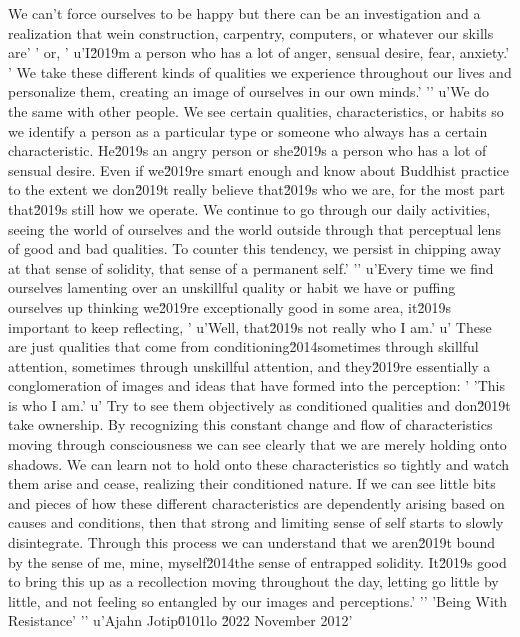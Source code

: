 We can't force ourselves to be happy but there can be an investigation 
and a realization that wein construction, carpentry, computers, or whatever our skills are'
' or, '
u'I\u2019m a person who has a lot of anger, sensual desire, fear, anxiety.'
' We take these different kinds of qualities we experience throughout our lives and personalize them, creating an image of ourselves in our own minds.'
'\n'
u'We do the same with other people. We see certain qualities, characteristics, or habits so we identify a person as a particular type or someone who always has a certain characteristic. He\u2019s an angry person or she\u2019s a person who has a lot of sensual desire. Even if we\u2019re smart enough and know about Buddhist practice to the extent we don\u2019t really believe that\u2019s who we are, for the most part that\u2019s still how we operate. We continue to go through our daily activities, seeing the world of ourselves and the world outside through that perceptual lens of good and bad qualities. To counter this tendency, we persist in chipping away at that sense of solidity, that sense of a permanent self.'
'\n'
u'Every time we find ourselves lamenting over an unskillful quality or habit we have or puffing ourselves up thinking we\u2019re exceptionally good in some area, it\u2019s important to keep reflecting, '
u'Well, that\u2019s not really who I am.'
u' These are just qualities that come from conditioning\u2014sometimes through skillful attention, sometimes through unskillful attention, and they\u2019re essentially a conglomeration of images and ideas that have formed into the perception: '
'This is who I am.'
u' Try to see them objectively as conditioned qualities and don\u2019t take ownership. By recognizing this constant change and flow of characteristics moving through consciousness we can see clearly that we are merely holding onto shadows. We can learn not to hold onto these characteristics so tightly and watch them arise and cease, realizing their conditioned nature. If we can see little bits and pieces of how these different characteristics are dependently arising based on causes and conditions, then that strong and limiting sense of self starts to slowly disintegrate. Through this process we can understand that we aren\u2019t bound by the sense of me, mine, myself\u2014the sense of entrapped solidity. It\u2019s good to bring this up as a recollection moving throughout the day, letting go little by little, and not feeling so entangled by our images and perceptions.'
'\n'
'Being With Resistance'
'\n'
u'Ajahn Jotip\u0101lo \u2022 November 2012'
